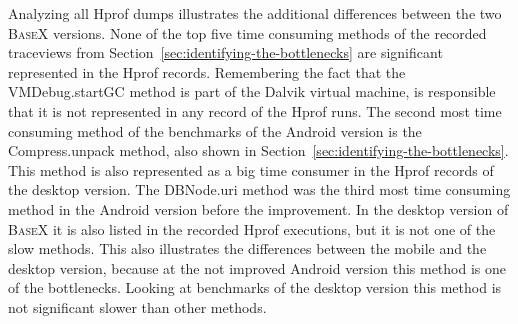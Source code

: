 Analyzing all Hprof dumps illustrates the additional differences between the two \textsc{BaseX} versions.
None of the top five time consuming methods of the recorded traceviews from Section~\ref{sec:identifying-the-bottlenecks} are significant represented in the Hprof records.
Remembering the fact that the \textsf{VMDebug.startGC} method is part of the Dalvik virtual machine, is responsible that it is not represented in any record of the Hprof runs.
The second most time consuming method of the benchmarks of the Android version is the \textsf{Compress.unpack} method, also shown in Section~\ref{sec:identifying-the-bottlenecks}.
This method is also represented as a big time consumer in the Hprof records of the desktop version.
The \textsf{DBNode.uri} method was the third most time consuming method in the Android version before the improvement.
In the desktop version of \textsc{BaseX} it is also listed in the recorded Hprof executions, but it is not one of the slow methods.
This also illustrates the differences between the mobile and the desktop version, because at the not improved Android version this method is one of the bottlenecks.
Looking at benchmarks of the desktop version this method is not significant slower than other methods.


